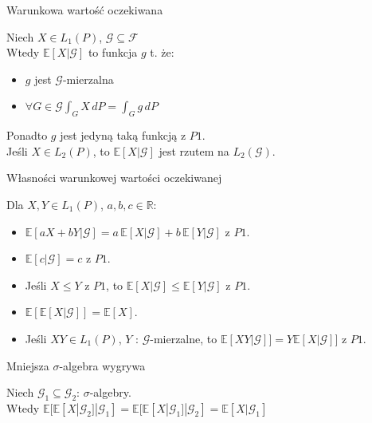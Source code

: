 \documentclass[avery5371,grid,frame]{flashcards}
\begin{document}


\begin{flashcard}[Definicja]{Warunkowa wartość oczekiwana}

\smallskip
Niech $ X \in L_1 (P)$, $ \mathcal{G} \subseteq  \mathcal{F}$ \\
Wtedy $\mathbb{E} [ X | \mathcal{G} ]$ to funkcja $g$ t. że:
\begin{itemize}
\item $g$ jest $\mathcal{G}$-mierzalna
\item $\forall G \in \mathcal{G} \int_G X \, dP = \int_G g \, dP$
\end{itemize}
Ponadto $g$ jest jedyną taką funkcją z $P1$. \\
Jeśli $X \in L_2(P)$, to $\mathbb{E} [ X | \mathcal{G} ]$ jest rzutem na $L_2(\mathcal{G})$.
\end{flashcard}

\begin{flashcard}[Twierdzenie]{Własności warunkowej wartości oczekiwanej}

Dla $X, Y \in L_1(P)$, $a, b, c \in \mathbb{R}$:
\begin{itemize}
\item $\mathbb{E}[aX +bY | \mathcal{G}] = a \, \mathbb{E}[ X | \mathcal{G} ] +
                                          b \, \mathbb{E}[ Y | \mathcal{G} ]$ z $P1$.
\item $\mathbb{E}[c | \mathcal{G} ] = c $ z $P1$.
\item Jeśli $X \leq Y $ z $P1$, to $ \mathbb{E}[X | \mathcal{G}] \leq \mathbb{E}[Y | \mathcal{G}]$ z $P1$.
\item $\mathbb{E} [ \mathbb{E} [ X | \mathcal{G} ] ] = \mathbb{E}[X]$.
\item Jeśli $XY \in L_1(P)$, $Y$ : $\mathcal{G}$-mierzalne, to $\mathbb{E}[XY|\mathcal{G}]] =
                                                                Y\mathbb{E}[X|\mathcal{G}]]$ z $P1$.
\end{itemize}
\end{flashcard}

\begin{flashcard}[Twierdzenie]{Mniejsza $\sigma$-algebra wygrywa}

\smallskip
Niech $\mathcal{G}_1 \subseteq \mathcal{G}_2$: $\sigma$-algebry. \\
Wtedy $\mathbb{E} [ \mathbb{E} [ X | \mathcal{G}_2] | \mathcal{G}_1 ] =
       \mathbb{E} [ \mathbb{E} [ X | \mathcal{G}_1] | \mathcal{G}_2 ] =
       \mathbb{E} [ X | \mathcal{G}_1]$
\end{flashcard}
\end{document}
